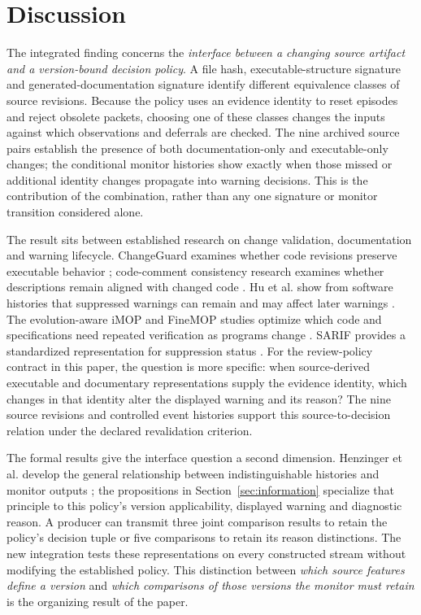 \documentclass[preprint,11pt]{elsarticle}
\begin{document}
\section{Discussion}
The integrated finding concerns the \emph{interface between a changing source artifact and a version-bound decision policy}. A file hash, executable-structure signature and generated-documentation signature identify different equivalence classes of source revisions. Because the policy uses an evidence identity to reset episodes and reject obsolete packets, choosing one of these classes changes the inputs against which observations and deferrals are checked. The nine archived source pairs establish the presence of both documentation-only and executable-only changes; the conditional monitor histories show exactly when those missed or additional identity changes propagate into warning decisions. This is the contribution of the combination, rather than any one signature or monitor transition considered alone.

The result sits between established research on change validation, documentation and warning lifecycle. ChangeGuard examines whether code revisions preserve executable behavior \cite{groninger2025changeguard}; code-comment consistency research examines whether descriptions remain aligned with changed code \cite{chen2024cocc}. Hu et al. show from software histories that suppressed warnings can remain and may affect later warnings \cite{hu2025suppressed}. The evolution-aware iMOP and FineMOP studies optimize which code and specifications need repeated verification as programs change \cite{guan2025imop,jiang2026finemop}. SARIF provides a standardized representation for suppression status \cite{oasis2019sarif}. For the review-policy contract in this paper, the question is more specific: when source-derived executable and documentary representations supply the evidence identity, which changes in that identity alter the displayed warning and its reason? The nine source revisions and controlled event histories support this source-to-decision relation under the declared revalidation criterion.

The formal results give the interface question a second dimension. Henzinger et al. develop the general relationship between indistinguishable histories and monitor outputs \cite{henzinger2022abstract}; the propositions in Section~\ref{sec:information} specialize that principle to this policy's version applicability, displayed warning and diagnostic reason. A producer can transmit three joint comparison results to retain the policy's decision tuple or five comparisons to retain its reason distinctions. The new integration tests these representations on every constructed stream without modifying the established policy. This distinction between \emph{which source features define a version} and \emph{which comparisons of those versions the monitor must retain} is the organizing result of the paper.
\end{document}
